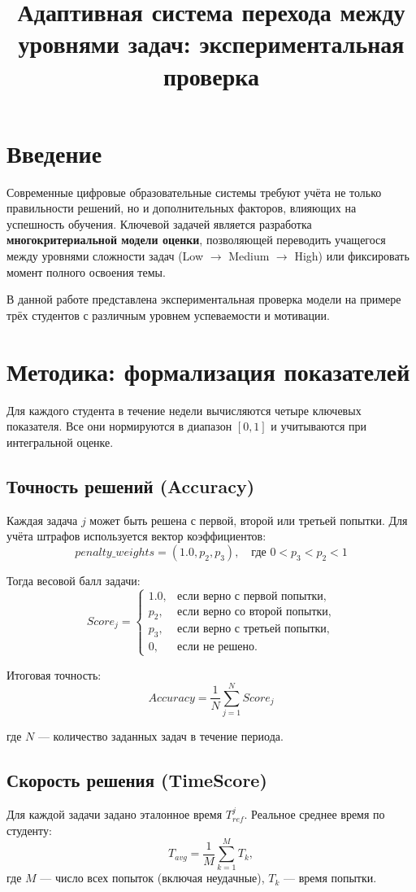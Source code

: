 \documentclass[12pt,a4paper]{article}
\title{Адаптивная система перехода между уровнями задач: экспериментальная проверка}
\author{ }
\date{}
\begin{document}
\maketitle

\section{Введение}
Современные цифровые образовательные системы требуют учёта не только правильности решений, но и дополнительных факторов, влияющих на успешность обучения. 
Ключевой задачей является разработка \textbf{многокритериальной модели оценки}, позволяющей переводить учащегося между уровнями сложности задач (Low $\rightarrow$ Medium $\rightarrow$ High) или фиксировать момент полного освоения темы.  

В данной работе представлена экспериментальная проверка модели на примере трёх студентов с различным уровнем успеваемости и мотивации.

\section{Методика: формализация показателей}

Для каждого студента в течение недели вычисляются четыре ключевых показателя.  
Все они нормируются в диапазон $[0,1]$ и учитываются при интегральной оценке.

\subsection{Точность решений (Accuracy)}
Каждая задача $j$ может быть решена с первой, второй или третьей попытки. 
Для учёта штрафов используется вектор коэффициентов:
\[
penalty\_weights = (1.0, p_2, p_3), \quad \text{где } 0 < p_3 < p_2 < 1
\]

Тогда весовой балл задачи:
\[
Score_j =
\begin{cases}
1.0, & \text{если верно с первой попытки}, \\
p_2, & \text{если верно со второй попытки}, \\
p_3, & \text{если верно с третьей попытки}, \\
0,   & \text{если не решено}.
\end{cases}
\]

Итоговая точность:
\[
Accuracy = \frac{1}{N} \sum_{j=1}^N Score_j
\]

где $N$ — количество заданных задач в течение периода.

\subsection{Скорость решения (TimeScore)}
Для каждой задачи задано эталонное время $T_{ref}^j$. 
Реальное среднее время по студенту:
\[
T_{avg} = \frac{1}{M}\sum_{k=1}^M T_k,
\]
где $M$ — число всех попыток (включая неудачные), $T_k$ — время попытки.
\end{document}
